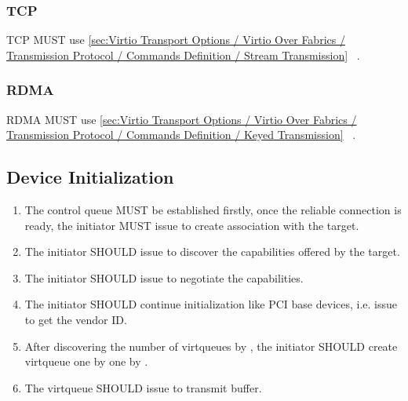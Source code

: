 \subsubsection{TCP}\label{sec:Virtio Transport Options / Virtio Over Fabrics / ransport Binding / TCP}
TCP MUST use \ref{sec:Virtio Transport Options / Virtio Over Fabrics / Transmission Protocol / Commands Definition / Stream Transmission}
~.

\subsubsection{RDMA}\label{sec:Virtio Transport Options / Virtio Over Fabrics / ransport Binding / RDMA}
RDMA MUST use \ref{sec:Virtio Transport Options / Virtio Over Fabrics / Transmission Protocol / Commands Definition / Keyed Transmission}
~.

\subsection{Device Initialization}\label{sec:Virtio Transport Options / Virtio Over Fabrics / Device Initialization}
\begin{enumerate}
\item The control queue MUST be established firstly, once the reliable
connection is ready, the initiator MUST issue
to create association with the target.
\item The initiator SHOULD issue
to discover the capabilities offered by the target.
\item The initiator SHOULD issue
to negotiate the capabilities.
\item The initiator SHOULD continue initialization like PCI base devices, i.e. issue
to get the vendor ID.
\item After discovering the number of virtqueues by
,
the initiator SHOULD create virtqueue one by one by
.
\item The virtqueue SHOULD issue
to transmit buffer.
\end{enumerate}

